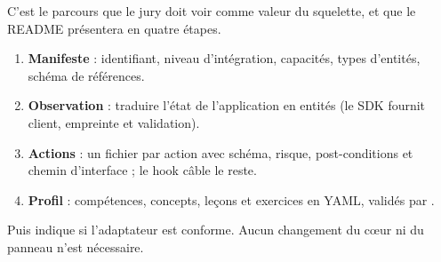 C'est le parcours que le jury doit voir comme valeur du squelette, et que le README présentera en quatre étapes.

\begin{enumerate}[leftmargin=1.2em]
  \item \textbf{Manifeste} : identifiant, niveau d'intégration, capacités, types d'entités, schéma de références.
  \item \textbf{Observation} : traduire l'état de l'application en entités (le SDK fournit client, empreinte et validation).
  \item \textbf{Actions} : un fichier par action avec schéma, risque, post-conditions et chemin d'interface ; le hook  câble le reste.
  \item \textbf{Profil} : compétences, concepts, leçons et exercices en YAML, validés par .
\end{enumerate}
Puis  indique si l'adaptateur est conforme. Aucun changement du cœur ni du panneau n'est nécessaire.
